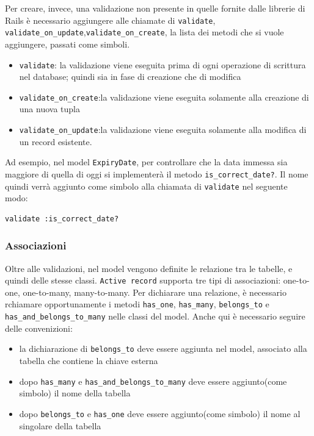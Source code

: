 \documentclass[11pt,a4paper]{article}
\begin{document}
Per creare, invece, una validazione non presente in quelle fornite dalle librerie di Rails è necessario aggiungere alle chiamate di \verb|validate|,\\ \verb|validate_on_update|,\verb|validate_on_create|, la lista dei metodi che si vuole aggiungere, passati come simboli.
\begin{itemize}
 \item \verb|validate|: la validazione viene eseguita prima di ogni operazione di scrittura nel database; quindi sia in fase di creazione che di modifica
 \item \verb|validate_on_create|:la validazione viene eseguita solamente alla creazione di una nuova tupla
 \item \verb|validate_on_update|:la validazione viene eseguita solamente alla modifica di un record esistente.
\end{itemize}

Ad esempio, nel model \verb|ExpiryDate|, per controllare che la data immessa sia maggiore di quella di oggi si implementerà il metodo \verb|is_correct_date?|. Il nome quindi verrà aggiunto come simbolo alla chiamata di \verb|validate| nel seguente modo: \\
\begin{verbatim}
validate :is_correct_date?
\end{verbatim}
\subsubsection*{Associazioni}
Oltre alle validazioni, nel model vengono definite le relazione tra le tabelle, e quindi delle stesse classi. \verb|Active record| supporta tre tipi di associazioni: one-to-one, one-to-many, many-to-many.
Per dichiarare una relazione, è necessario rchiamare opportunamente i metodi \verb|has_one|, \verb|has_many|, \verb|belongs_to| e \verb|has_and_belongs_to_many| nelle classi del model.
Anche qui è necessario seguire delle convenizioni:
\begin{itemize}
 \item la dichiarazione di \verb|belongs_to| deve essere aggiunta nel model, associato alla tabella che contiene la chiave esterna
 \item dopo \verb|has_many| e \verb|has_and_belongs_to_many| deve essere aggiunto(come simbolo) il nome della tabella
 \item dopo \verb|belongs_to| e \verb|has_one| deve essere aggiunto(come simbolo) il nome al singolare della tabella
\end{itemize}
\end{document}
